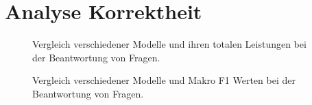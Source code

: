 \section{Analyse Korrektheit}\label{sec:results:correctness}
\begin{figure}
    \caption{Vergleich verschiedener Modelle und ihren totalen Leistungen bei der Beantwortung von Fragen.}
    \label{fig:results:answers_total}
\end{figure}
\begin{figure}
    \caption{Vergleich verschiedener Modelle und Makro F1 Werten bei der Beantwortung von Fragen.}
    \label{fig:results:makro_total}
\end{figure}
